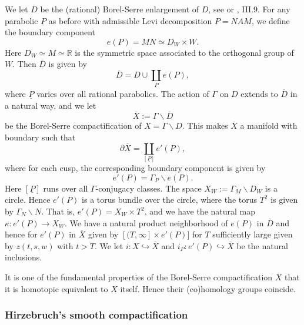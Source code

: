 \documentclass[12pt,leqno]{amsart}
\numberwithin{equation}{section}
\theoremstyle{plain}
\theoremstyle{definition}
\theoremstyle{remark}
\newcommand{\R}{\mathbb{R}}
\newcommand{\G}{\Gamma}
\newcommand{\back}{\backslash}
\begin{document}
We let $\overline{D}$ be the (rational) Borel-Serre enlargement of $D$, see \cite{BorelSerre} or \cite{BJ}, III.9. For any parabolic $\underline{P}$ as before with admissible Levi decomposition $P=NAM$, we define the boundary component
\begin{equation*}
e({P}) = MN \simeq D_W \times W.
\end{equation*}
Here $D_W \simeq M \simeq \R$ is the symmetric space associated to the orthogonal group of $W$. Then $\overline{D}$ is given by 
\begin{equation*}
\overline{D} = D \cup \coprod_{\underline{P}} e({P}),
\end{equation*}
where $\underline{P}$ varies over all rational parabolics. The action of $\G$ on $D$ extends to $\overline{D}$ in a natural way, and we let 
\begin{equation*}
\overline{X}:= \G \back \overline{D}
\end{equation*}
be the Borel-Serre compactification of $X = \G \back D$. This makes $\overline{X}$ a manifold with boundary such that
\[
\partial \overline{X} = \coprod_{[\underline{P}]} e'({P}),
\]
where for each cusp, the corresponding boundary component is given by
\[
e'(P) = \G_P \back e(P).
\]
Here $[\underline{P}]$ runs over all $\G$-conjugacy classes. The space $X_W := \G_M \back D_W$ is a circle. Hence $e'(P)$ is a torus bundle over the circle, where the torus $T^2$ is given by $\G_N \back N$. That is, $
e'(P) = X_W \times T^2$, and we have the natural map $\kappa: e'(P) \to X_W$. We have a natural product neighborhood of $e(P)$ in $\overline{D}$ and hence for $e'(P)$ in $\overline{X}$ given by $[(T,\infty] \times e'(P)]$ for $T$ sufficiently large given by $z(t,s,w)$ with $t>T$. We let $i: X \hookrightarrow \overline{X}$ and $i_P: e'(P)\hookrightarrow \overline{X} $ be the natural inclusions.

It is one of the fundamental properties of the Borel-Serre compactification $\overline{X}$ that it is homotopic equivalent to $X$ itself. Hence their (co)homology groups coincide. 



\subsubsection{Hirzebruch's smooth compactification}\label{H-compact}
\end{document}
